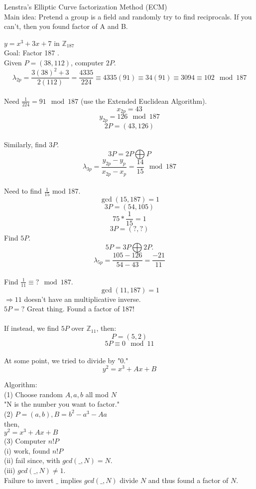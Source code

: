 Lenstra's Elliptic Curve factorization Method (ECM)
\\Main idea: Pretend a group is a field and randomly try to find reciprocals. If you can't, then you found factor of A and B. 
\begin{example} 
$y= x^{3}+3x+7$ in $\mathbb{Z}_{187}$
\\Goal: Factor 187 .
\\Given $P=(38,112)$, computer $2P$.
\\
$$\lambda_{2p} = \frac{3(38)^{2}+3}{2(112)}=\frac{4335}{224}\equiv4335(91)\equiv34(91)\equiv3094\equiv102\mod{187}$$
\\
Need $\frac{1}{224}=91\mod{187}$ (use the Extended Euclidean Algorithm). 
\\
$$x_{2p}=43$$
$$y_{2p}=126\mod{187}$$
$$2P = (43, 126)$$
\\
Similarly, find $3P$.
$$3P=2P \bigoplus P$$
$$\lambda_{3p}=\frac{y_{2p}-y_{p}}{x_{2p}-x_{p}}=\frac{14}{15}\mod{187}$$
\\Need to find $\frac{1}{15}$ mod 187.
$$\gcd(15,187)=1$$     
$$3P=(54,105)$$
$$75*\frac{1}{15}=1$$
$$3P=(?,?)$$
Find $5P$. 
$$5P=3P\bigoplus 2P.$$
$$\lambda_{5p}=\frac{105-126}{54-43}=\frac{-21}{11}$$
\\Find $\frac{1}{11}\equiv ?\mod{187}$.
$$\gcd(11,187)=1$$
$\Rightarrow 11$ doesn't have an multiplicative inverse.
\\
$5P= ?$ Great thing. Found a factor of 187! 
\\
\\If instead, we find $5P$ over $\mathbb{Z}_{11}$, then: 
$$P=(5,2)$$
$$5P \equiv 0 \mod{11}$$
\\At some point, we tried to divide by "0."\\
$$y^{2}=x^{3}+Ax+B$$
\end{example}

Algorithm:
\\(1) Choose random $A,a,b$ all mod $N$
\\"N is the number you want to factor."
\\(2) $P=(a,b), B=b^{2}-a^{3}-Aa$
\\then,
\\ $y^{2}=x^{3}+Ax+B$
\\(3) Computer $n!P$\\
\indent (i) work, found $n!P$\\
\indent (ii) fail since, with $gcd ({\_}, N)=N$.\\
\indent (iii) $gcd ({\_},N) \neq 1$.\\
\indent Failure to invert ${\_}$ implies $gcd({\_},N)$ divide $N$ and thus found a factor of $N$.

